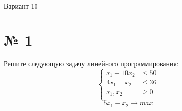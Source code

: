\documentclass{article}%
\begin{document}
%
\newpage%
\begin{center}%
\begin{Huge}%
Вариант 10%
\end{Huge}%
\end{center}%
\section*{№ 1}%
\label{sec:1}%
Решите следующую задачу линейного программирования: %
\[%
\left\{\begin{aligned}x_{1}+10x_{2} & \le50 \\4x_{1}-x_{2} & \le36 \\x_{1},x_{2} & \ge 0 \\\end{aligned}\right.%
\]%
\[%
5x_{1}-x_{2}  \to max%
\]

%
\newpage%
\end{document}
